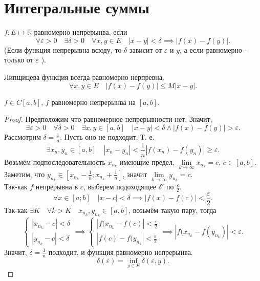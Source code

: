 \documentclass[11pt, oneside]{article}   	%
\begin{document}
\section{Интегральные суммы}
    \begin{definition}
        $f: E \mapsto \mathbb{R}$ равномерно непрерынва, если
        \[ \forall{\varepsilon > 0}\quad \exists{\delta > 0}\quad \forall{x, y\in E}\quad |x-y| < \delta \implies|f(x)-f(y)| .\]
        (Если функция непрерывна всюду, то $\delta$ зависит от $\varepsilon$ и $y$, а если равномерно - только от $\varepsilon$ ).
    \end{definition}
    \begin{dlemma}
        Липщицева функция всегда равномерно нерпревна.
        \[ \forall{x, y\in E} \quad |f(x) - f(y)| \le M |x-y|.\] 
    \end{dlemma}
    \begin{theorem}
        $f\in C[a, b]$, $f$ равномерно непрерынва на $\left[a, b\right]$.
        \begin{proof}
            Предположим что равномерное непрерывности нет.
            Значит, 
            \[ \exists{\varepsilon > 0}\quad \forall{\delta > 0}\quad \exists{x, y\in \left[a, b\right]}\quad |x-y| < \delta \land |f(x)-f(y)| > \varepsilon  .\]
            Рассмотрим $\delta=\frac{1}{n}$. Пусть оно не подходит. Т. е.
            \[ \exists{x_n, y_n\in \left[a, b\right]}\quad |x_n - y_n| < \frac{1}{n} |f(x_n) - f(y_n)| \ge \varepsilon  .\]
            Возьмём подпоследовательность $x_{n_k}$ имеющие предел, $\lim\limits_{k \to \infty} x_{n_{k}} = c$, $c\in \left[a, b\right]$.\\
            Заметим, что $y_{n_k}\in \left[x_{n_k} - \frac{1}{n}; x_{n_k} + \frac{1}{n}\right]$, значит $\lim\limits_{k \to \infty} y_{n_k} = c$.\\
            Так-как $f$ непрерывна в $c$, выберем подоходящее $\delta'$ по $\frac{\varepsilon}{2}$.\\
            \[ \forall{x\in \left[a; b\right]}\quad |x-c| < \delta \implies |f(x)-f(c)| < \frac{\varepsilon}{2} .\]
            Так-как $\exists{K}\quad \forall{k > K}\quad x_{n_k}, y_{n_k}\in \left[a, b\right]$, возьмём такую пару, тогда
            \[ \begin{cases}
                |x_{n_k} - c| < \delta\\
                |y_{n_k} - c| < \delta
            \end{cases} \implies \begin{cases}
            |f(x_{n_k}-f(c)| < \frac{\varepsilon}{2}\\
            |f(c) - f(y_{n_k}| < \frac{\varepsilon}{2}
        \end{cases} \implies |f(x_{n_k} - f(y_{n_k})| < \varepsilon .\]
        Значит, $\delta = \frac{1}{n}$ подходит, и функция равномерно непрерынва.
            \[ \delta(\varepsilon) = \inf\limits_{y\in E} \delta(\varepsilon, y) .\] 
        \end{proof}
    \end{theorem}
\end{document}
